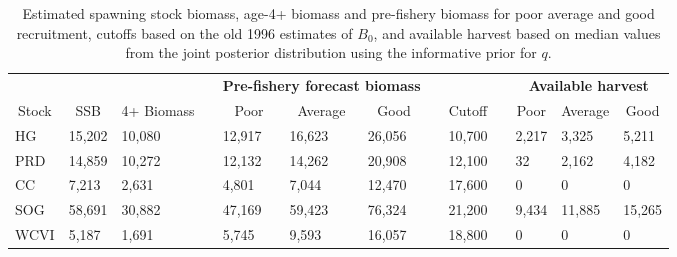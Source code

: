 %
\begin{table}[!tbp]
 \small
 \caption{Estimated spawning stock biomass,  age-4+ biomass and pre-fishery
			biomass for poor average and good recruitment,  cutoffs based on the old 1996 estimates of $B_0$,  and 
			available harvest based on median values from the joint posterior distribution using the informative prior for $q$.\label{TableCatchAdvice3}} 
 \begin{center}
 \begin{tabular}{lllclllclclll}\hline\hline
\multicolumn{3}{c}{\bfseries }&
\multicolumn{1}{c}{\bfseries }&
\multicolumn{3}{c}{\bfseries Pre-fishery forecast biomass}&
\multicolumn{1}{c}{\bfseries }&
\multicolumn{1}{c}{\bfseries }&
\multicolumn{1}{c}{\bfseries }&
\multicolumn{3}{c}{\bfseries Available harvest}
\tabularnewline \cline{1-13}
\multicolumn{1}{c}{Stock}&\multicolumn{1}{c}{SSB}&\multicolumn{1}{c}{4+ Biomass}&\multicolumn{1}{c}{}&\multicolumn{1}{c}{Poor}&\multicolumn{1}{c}{Average}&\multicolumn{1}{c}{Good}&\multicolumn{1}{c}{}&\multicolumn{1}{c}{Cutoff}&\multicolumn{1}{c}{}&\multicolumn{1}{c}{Poor}&\multicolumn{1}{c}{Average}&\multicolumn{1}{c}{Good}\tabularnewline
\hline
HG&15,202&10,080&&12,917&16,623&26,056&&10,700&& 2,217& 3,325& 5,211\tabularnewline
PRD&14,859&10,272&&12,132&14,262&20,908&&12,100&&    32& 2,162& 4,182\tabularnewline
CC& 7,213& 2,631&& 4,801& 7,044&12,470&&17,600&&     0&     0&     0\tabularnewline
SOG&58,691&30,882&&47,169&59,423&76,324&&21,200&& 9,434&11,885&15,265\tabularnewline
WCVI& 5,187& 1,691&& 5,745& 9,593&16,057&&18,800&&     0&     0&     0\tabularnewline
\hline
\end{tabular}

\end{center}

\end{table}

